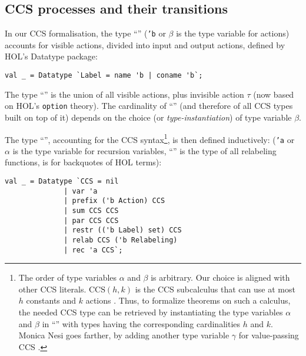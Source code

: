 
\subsection{CCS processes and their transitions}

In our CCS formalisation, the type ``'' (\texttt{'b} or
$\beta$ is the type variable for actions) accounts for visible actions, divided into input
and output actions, defined by HOL's Datatype package:
\begin{lstlisting}
val _ = Datatype `Label = name 'b | coname 'b`;
\end{lstlisting}
The type ``'' is the
union of all visible actions, plus invisible action $\tau$ (now based on
HOL's \texttt{option} theory). The cardinality of
``'' (and therefore of all
CCS types built on top of it)
 depends on the choice (or \emph{type-instantiation}) of type variable $\beta$.

The type ``'', accounting for the CCS
syntax\footnote{The order of type variables $\alpha$ and $\beta$
    is arbitrary. Our choice is aligned with other CCS literals.
$\mathrm{CCS}(h,k)$ is the CCS subcalculus that can use at most $h$ constants
and $k$ actions \cite{gorrieri2017ccs}. Thus, to formalize theorems on
such a calculus, the needed CCS type can be retrieved by instantiating the type
variables $\alpha$ and $\beta$ in ``'' with types
having the corresponding cardinalities $h$ and $k$. Monica Nesi goes
farther, by adding another type variable $\gamma$ for value-passing CCS
\cite{Nesi:2017wo}.}, is then defined inductively:
(\texttt{'a} or $\alpha$ is the type variable for recursion variables,
``'' is the type of all relabeling functions,
\mbox{} is for backquotes of HOL terms):
\begin{lstlisting}
val _ = Datatype `CCS = nil
		      | var 'a
		      | prefix ('b Action) CCS
		      | sum CCS CCS
		      | par CCS CCS
		      | restr (('b Label) set) CCS
		      | relab CCS ('b Relabeling)
		      | rec 'a CCS`;
\end{lstlisting}


